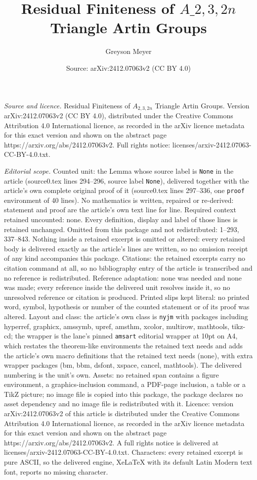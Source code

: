 \documentclass[10pt,a4paper]{amsart}
\title[Residual Finiteness of $A\_{2,3,2n}$ Triangle Artin Groups]{Residual Finiteness of $A\_{2,3,2n}$ Triangle Artin Groups}
\author{Greyson Meyer}
\date{Source: arXiv:2412.07063v2 (CC BY 4.0)}
\begin{document}
\maketitle

\noindent\emph{Source and licence.} Residual Finiteness of $A_{2,3,2n}$ Triangle Artin Groups. Version arXiv:2412.07063v2 (CC BY 4.0), distributed under the Creative Commons Attribution 4.0 International licence, as recorded in the arXiv licence metadata for this exact version and shown on the abstract page https://arxiv.org/abs/2412.07063v2. Full rights notice: licenses/arxiv-2412.07063-CC-BY-4.0.txt.\par\smallskip

\noindent\textit{Editorial scope.} Counted unit: the Lemma whose source label is \texttt{None} in the article (source0.tex lines 294--296, source label \texttt{None}), delivered together with the article's own complete original proof of it (source0.tex lines 297--336, one \texttt{proof} environment of 40 lines). No mathematics is written, repaired or re-derived: statement and proof are the article's own text line for line. Required context retained uncounted: none. Every definition, display and label of those lines is retained unchanged. Omitted from this package and not redistributed: 1--293, 337--843. Nothing inside a retained excerpt is omitted or altered: every retained body is delivered exactly as the article's lines are written, so no omission receipt of any kind accompanies this package. Citations: the retained excerpts carry no citation command at all, so no bibliography entry of the article is transcribed and no reference is redistributed. Reference adaptation: none was needed and none was made; every reference inside the delivered unit resolves inside it, so no unresolved reference or citation is produced. Printed slips kept literal: no printed word, symbol, hypothesis or number of the counted statement or of its proof was altered. Layout and class: the article's own class is \texttt{nyjm} with packages including hyperref, graphicx, amssymb, upref, amsthm, xcolor, multirow, mathtools, tikz-cd; the wrapper is the lane's pinned \texttt{amsart} editorial wrapper at 10pt on A4, which restates the theorem-like environments the retained text needs and adds the article's own macro definitions that the retained text needs (none), with extra wrapper packages (bm, bbm, dsfont, xspace, cancel, mathtools). The delivered numbering is the unit's own. Assets: no retained span contains a figure environment, a graphics-inclusion command, a PDF-page inclusion, a table or a TikZ picture; no image file is copied into this package, the package declares no asset dependency and no image file is redistributed with it. Licence: version arXiv:2412.07063v2 of this article is distributed under the Creative Commons Attribution 4.0 International licence, as recorded in the arXiv licence metadata for this exact version and shown on the abstract page https://arxiv.org/abs/2412.07063v2. A full rights notice is delivered at licenses/arxiv-2412.07063-CC-BY-4.0.txt. Characters: every retained excerpt is pure ASCII, so the delivered engine, XeLaTeX with its default Latin Modern text font, reports no missing character.
\end{document}

